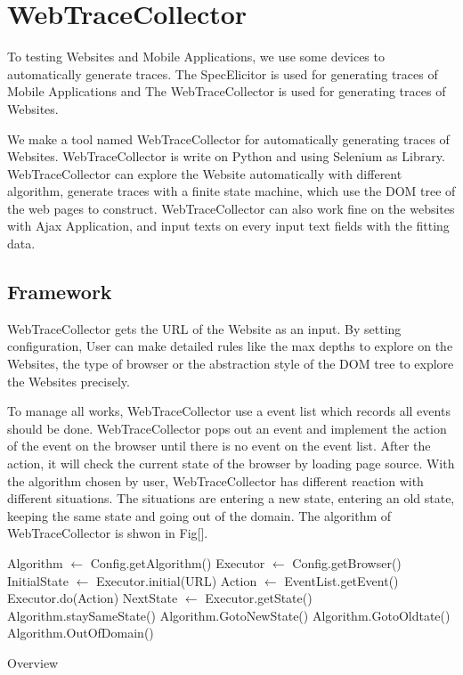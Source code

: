 
\chapter{WebTraceCollector}\label{ch:traceCollector}

To testing Websites and Mobile Applications, 
we use some devices to automatically generate traces.
The SpecElicitor is used for generating traces of Mobile Applications
and The WebTraceCollector is used for generating traces of Websites.

We make a tool named WebTraceCollector for automatically generating traces of Websites.
WebTraceCollector is write on Python and using Selenium as Library.
WebTraceCollector can explore the Website automatically with different algorithm,
generate traces with a finite state machine, which use the DOM\cite{DOM} tree of the web pages to construct.
WebTraceCollector can also work fine on the websites with Ajax Application,
and input texts on every input text fields with the fitting data.


\section{Framework}

WebTraceCollector gets the URL of the Website as an input.
By setting configuration, User can make detailed rules like the max depths to explore on the Websites, the type of browser or the abstraction style of the DOM tree to explore the Websites precisely.

To manage all works, WebTraceCollector use a event list which records all events should be done.
WebTraceCollector pops out an event and implement the action of the event on the browser until there is no event on the event list.
After the action, it will check the current state of the browser by loading page source.
With the algorithm chosen by user, WebTraceCollector has different reaction with different situations.
The situations are entering a new state, entering an old state, keeping the same state and going out of the domain.
The algorithm of WebTraceCollector is shwon in Fig[].

\begin{algorithm}[htb]
	\begin{doublespace}		
		Algorithm $\gets$ Config.getAlgorithm()\;
		Executor $\gets$ Config.getBrowser()\;
		InitialState $\gets$ Executor.initial(URL)\;
		{
			Action $\gets$ EventList.getEvent()\;
			Executor.do(Action)\;
			NextState $\gets$ Executor.getState()\;
			{
				{ Algorithm.staySameState() }
				{ Algorithm.GotoNewState() }
				{ Algorithm.GotoOldtate() }
				{ Algorithm.OutOfDomain() }
			}			
		}		
	\end{doublespace}
	\caption{Overview}
	\label{algorithm:overview}
\end{algorithm} 

